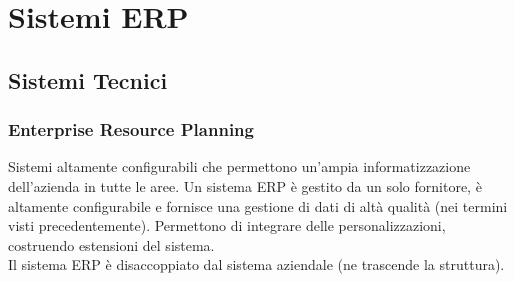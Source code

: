 \chapter{Sistemi ERP}
\label{chap:Sistemi ERP}
\section{Sistemi Tecnici}
\label{sec:Sistemi Tecnici}

\subsection{Enterprise Resource Planning}
\label{sub:Enterprise Resource Planning}
Sistemi altamente configurabili che permettono un'ampia informatizzazione
dell'azienda in tutte le aree. Un sistema ERP \`e gestito da un solo fornitore,
\`e altamente configurabile e fornisce una gestione di dati di alt\`a qualit\`a
(nei termini visti precedentemente). Permettono di integrare delle personalizzazioni,
costruendo estensioni del sistema.\\
Il sistema ERP \`e disaccoppiato dal sistema aziendale (ne trascende la struttura).\\
